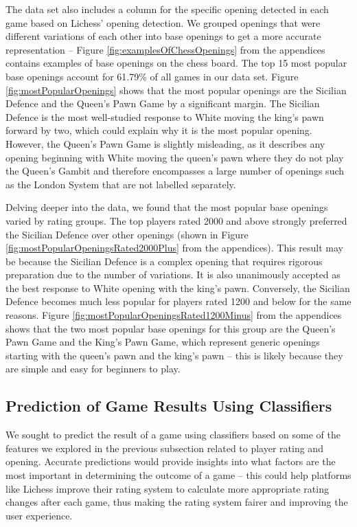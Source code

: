 \documentclass[a4paper, 11pt]{article}
\begin{document}
The data set also includes a column for the specific opening detected in each game based on Lichess' opening detection. We grouped openings that were different variations of each other into base openings to get a more accurate representation -- Figure \ref{fig:examplesOfChessOpenings} from the appendices contains examples of base openings on the chess board. The top 15 most popular base openings account for 61.79\% of all games in our data set. Figure \ref{fig:mostPopularOpenings} shows that the most popular openings are the Sicilian Defence and the Queen's Pawn Game by a significant margin. The Sicilian Defence is the most well-studied response to White moving the king's pawn forward by two, which could explain why it is the most popular opening. However, the Queen's Pawn Game is slightly misleading, as it describes any opening beginning with White moving the queen's pawn where they do not play the Queen's Gambit and therefore encompasses a large number of openings such as the London System that are not labelled separately.

Delving deeper into the data, we found that the most popular base openings varied by rating groups. The top players rated 2000 and above strongly preferred the Sicilian Defence over other openings (shown in Figure \ref{fig:mostPopularOpeningsRated2000Plus} from the appendices). This result may be because the Sicilian Defence is a complex opening that requires rigorous preparation due to the number of variations. It is also unanimously accepted as the best response to White opening with the king's pawn. Conversely, the Sicilian Defence becomes much less popular for players rated 1200 and below for the same reasons. Figure \ref{fig:mostPopularOpeningsRated1200Minus} from the appendices shows that the two most popular base openings for this group are the Queen's Pawn Game and the King's Pawn Game, which represent generic openings starting with the queen's pawn and the king's pawn -- this is likely because they are simple and easy for beginners to play.

\subsection{Prediction of Game Results Using Classifiers}
We sought to predict the result of a game using classifiers based on some of the features we explored in the previous subsection related to player rating and opening. Accurate predictions would provide insights into what factors are the most important in determining the outcome of a game -- this could help platforms like Lichess improve their rating system to calculate more appropriate rating changes after each game, thus making the rating system fairer and improving the user experience.
\end{document}
